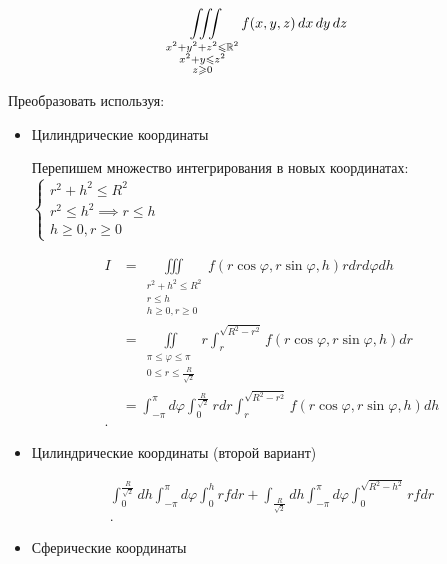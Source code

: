 \begin{example}
        \[\iiint\limits_{\substack{x^2+y^2+z^2 \leqslant \mathbb{R}^2\\ x^2 + y \leqslant z^2\\ z\geqslant 0}} f(x, y, z ) \,dx \,dy \,dz\]

        Преобразовать используя:
        \begin{itemize}
            \item Цилиндрические координаты

            Перепишем множество интегрирования в новых координатах:
            $\begin{cases}
                r^2+h^2 \leqslant R^2\\
                r^2\leqslant h^2 \implies r\leqslant h\\
                h\geqslant 0, r\geqslant 0
            \end{cases}$

            \begin{align*}
                I &= \iiint\limits_{\substack{r^2 + h^2 \leqslant R^2\\ r\leqslant h\\ h\geqslant 0, r\geqslant 0}} f\left( r\cos\varphi, r\sin\varphi, h \right) rdrd\varphi dh\\ 
                &= \iint\limits_{\substack{\pi \leqslant \varphi \leqslant  \pi\\ 0\leqslant r\leqslant \frac{R}{\sqrt 2}}} r \int_{r}^{\sqrt{R^2 - r^2} } f\left( r\cos\varphi, r\sin\varphi, h \right) dr \\
                &= \int_{-\pi}^{\pi}d\varphi \int_0^{\frac{R}{\sqrt 2}} rdr \int_r^{\sqrt{R^2 - r^2}} f\left( r\cos\varphi, r\sin\varphi, h \right) dh \\
            .\end{align*}

            \item Цилиндрические координаты (второй вариант)

             \begin{align*}
                 \int_0^{\frac{R}{\sqrt 2}} dh \int_{-\pi}^{\pi}d\varphi \int_0^h r fdr + \int_{\frac{R}{\sqrt 2}} dh \int_{-\pi}^{\pi}d\varphi \int_0^{\sqrt{R^2 - h^2}} rfdr\\
             .\end{align*}
            \item Сферические координаты

            
        \end{itemize}


\end{example}

\endinput